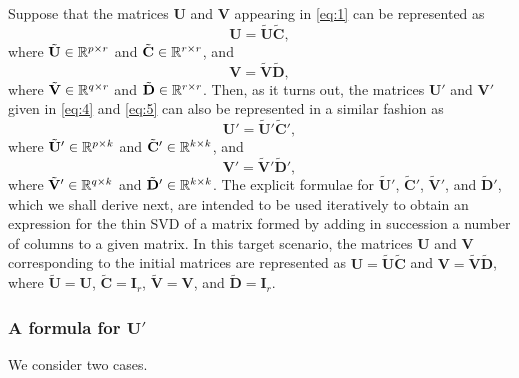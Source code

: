 \documentclass[11pt,a4paper]{article}
\theoremstyle{break}
\numberwithin{dummy}{section}
\theoremstyle{plain}
\theoremstyle{plain}
\theoremstyle{plain}
\theoremstyle{plain}
\theoremstyle{plain}
\theoremstyle{MyNonumberplain}
\newcommand{\0}{\M{0}}
\newcommand{\M}[1]{\mathbf{#1}}
\newcommand{\Mt}[1]{\tilde{\M{#1}}}
\newcommand{\R}{\mathbb{R}}
\newcommand{\Mat}[2]{%
  \ifthenelse{\equal{#2}{1}}
  {\R^{#1}}
  {\R^{#1 \times #2}}
}
\begin{document}
Suppose that the matrices $\M{U}$ and $\M{V}$ appearing in \eqref{eq:1} can be represented as
\begin{equation}
  \label{eq:13}
  \M{U} = \Mt{U} \Mt{C},
 \end{equation}
 where $\Mt{U} \in \Mat{p}{r}$ and $\Mt{C} \in \Mat{r}{r}$, and
\begin{equation}
  \label{eq:14}
  \M{V} = \Mt{V} \Mt{D}, 
 \end{equation}
 where $\Mt{V} \in \Mat{q}{r}$ and $\Mt{D} \in \Mat{r}{r}$.  Then, as it turns out, the matrices $\M{U}'$ and $\M{V}'$ given in \eqref{eq:4} and \eqref{eq:5} can also be represented in a similar fashion as
\begin{equation}
  \label{eq:15}
  \M{U}' = \Mt{U}' \Mt{C}', 
\end{equation}
where $\Mt{U}' \in \Mat{p}{k}$ and $\Mt{C}' \in \Mat{k}{k}$, and
\begin{equation}
  \label{eq:16}
  \M{V}' = \Mt{V}' \Mt{D}', 
\end{equation}
where $\Mt{V}' \in \Mat{q}{k}$ and $\Mt{D}' \in \Mat{k}{k}$.  The explicit formulae for $\Mt{U}'$, $\Mt{C}'$, $\Mt{V}'$, and $\Mt{D}'$, which we shall derive next, are intended to be used iteratively to obtain an expression for the thin SVD of a matrix formed by adding in succession a number of columns to a given matrix. In this target scenario, the matrices $\M{U}$ and $\M{V}$ corresponding to the initial matrices are represented as $\M{U} = \Mt{U} \Mt{C}$ and $\M{V} = \Mt{V} \Mt{D}$, where $\Mt{U} = \M{U}$, $\Mt{C} = \M{I}_r$, $\Mt{V} = \M{V}$, and $\Mt{D} = \M{I}_r$.

\subsubsection{A formula for $\M{U}'$}

We consider two cases.
\end{document}
